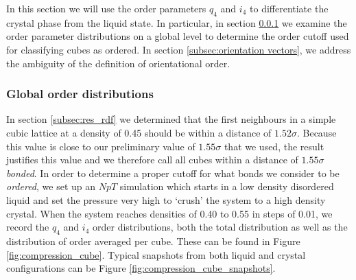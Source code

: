 \documentclass[thesis]{subfiles}
\begin{document}
In this section we will use the order parameters $q_4$ and $i_4$ to differentiate the crystal phase from the liquid state. In particular, in section \ref{subsec:res_order cutoff} we examine the order parameter distributions on a global level to determine the order cutoff used for classifying cubes as ordered. In section \ref{subsec:orientation vectors}, we address the ambiguity of the definition of orientational order.

\subsubsection{Global order distributions}\label{subsec:res_order cutoff}

In section \ref{subsec:res_rdf} we determined that the first neighbours in a simple cubic lattice at a density of 0.45 should be within a distance of $1.52\sigma$. Because this value is close to our preliminary value of $1.55\sigma$ that we used, the result justifies this value and we therefore call all cubes within a distance of $1.55\sigma$ \emph{bonded}.
In order to determine a proper cutoff for what bonds we consider to be \emph{ordered}, we set up an $NpT$ simulation which starts in a low density disordered liquid and set the pressure very high to `crush' the system to a high density crystal. When the system reaches densities of 0.40 to 0.55 in steps of 0.01, we record the $q_4$ and $i_4$ order distributions, both the total distribution as well as the distribution of order averaged per cube. These can be found in Figure \ref{fig:compression_cube}. Typical snapshots from both liquid and crystal configurations can be Figure \ref{fig:compression_cube_snapshots}.
\end{document}
